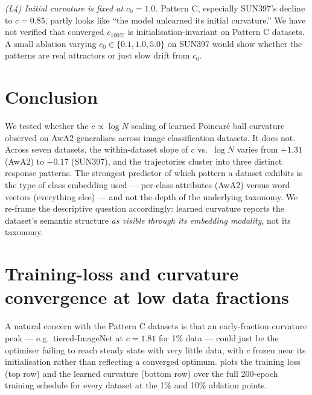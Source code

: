\documentclass{article}
\begin{document}
\textit{(L4) Initial curvature is fixed at $c_0 = 1.0$.}
Pattern C, especially SUN397's decline to $c = 0.85$, partly looks like ``the model unlearned its initial curvature.'' We have not verified that converged $c_{100\%}$ is initialisation-invariant on Pattern C datasets. A small ablation varying $c_0 \in \{0.1, 1.0, 5.0\}$ on SUN397 would show whether the patterns are real attractors or just slow drift from $c_0$.

\section{Conclusion}\label{sec:conclusion}

We tested whether the $c \propto \log N$ scaling of learned Poincar\'{e} ball curvature observed on AwA2 generalises across image classification datasets.
It does not.
Across seven datasets, the within-dataset slope of $c$ vs.\ $\log N$ varies from $+1.31$ (AwA2) to $-0.17$ (SUN397), and the trajectories cluster into three distinct response patterns.
The strongest predictor of which pattern a dataset exhibits is the type of class embedding used --- per-class attributes (AwA2) versus word vectors (everything else) --- and not the depth of the underlying taxonomy.
We re-frame the descriptive question accordingly: learned curvature reports the dataset's semantic structure \emph{as visible through its embedding modality}, not its taxonomy.

\appendix

\section{Training-loss and curvature convergence at low data fractions}\label{app:convergence}

A natural concern with the Pattern C datasets is that an early-fraction curvature peak --- e.g.\ tiered-ImageNet at $c = 1.81$ for 1\% data --- could just be the optimiser failing to reach steady state with very little data, with $c$ frozen near its initialisation rather than reflecting a converged optimum.
 plots the training loss (top row) and the learned curvature (bottom row) over the full 200-epoch training schedule for every dataset at the 1\% and 10\% ablation points.
\end{document}
